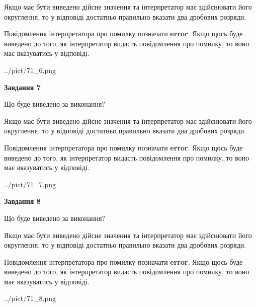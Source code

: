 \documentclass[12pt, ukrainian]{article}
\begin{document}
{\begin {Large}
Якщо має бути виведено дійсне значення та інтерпретатор має здійснювати його округлення, 
то у відповіді достатньо правильно вказати два дробових розряди.

Повідомлення інтерпретатора про помилку позначати \textbf{error}.
Якщо щось буде виведено до того, як інтерпретатор видасть повідомлення про помилку, 
то воно має вказуватись у відповіді. \par

\begin{center}
	{../pict/71_6.png}
\end{center}
\newpage

{\begin {center}\textbf{Завдання 7}\end {center}}\par
Що буде виведено за виконання? \par

Якщо має бути виведено дійсне значення та інтерпретатор має здійснювати його округлення, 
то у відповіді достатньо правильно вказати два дробових розряди.

Повідомлення інтерпретатора про помилку позначати \textbf{error}.
Якщо щось буде виведено до того, як інтерпретатор видасть повідомлення про помилку, 
то воно має вказуватись у відповіді. \par

\begin{center}
	{../pict/71_7.png}
\end{center}
\newpage

{\begin {center}\textbf{Завдання 8}\end {center}}\par
Що буде виведено за виконання? \par

Якщо має бути виведено дійсне значення та інтерпретатор має здійснювати його округлення, 
то у відповіді достатньо правильно вказати два дробових розряди.

Повідомлення інтерпретатора про помилку позначати \textbf{error}.
Якщо щось буде виведено до того, як інтерпретатор видасть повідомлення про помилку, 
то воно має вказуватись у відповіді. \par

\begin{center}
	{../pict/71_8.png}
\end{center}
\newpage


\end{Large}}
\end{document}
